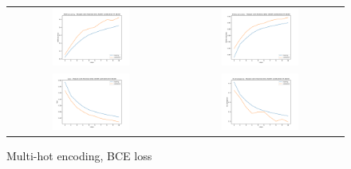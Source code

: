 \begin{appendices}
        \begin{figure}[H]
            \centering
            \begin{tabular}{cc}
                \includegraphics[width=0.48\textwidth]{figures/training_plots/ModelA-(1D)-MultiHot-BCE-ADAM_12-04-2019_07-48-00_AON-accuracy.pdf} & \includegraphics[width=0.48\textwidth]{figures/training_plots/ModelA-(1D)-MultiHot-BCE-ADAM_12-04-2019_07-48-00_binary-accuracy.pdf} \\
                \includegraphics[width=0.48\textwidth]{figures/training_plots/ModelA-(1D)-MultiHot-BCE-ADAM_12-04-2019_07-48-00_loss.pdf} & \includegraphics[width=0.48\textwidth]{figures/training_plots/ModelA-(1D)-MultiHot-BCE-ADAM_12-04-2019_07-48-00_KL-divergence.pdf}
            \end{tabular}
            \caption*{Multi-hot encoding, BCE loss}
        \end{figure}
        

\end{appendices}
